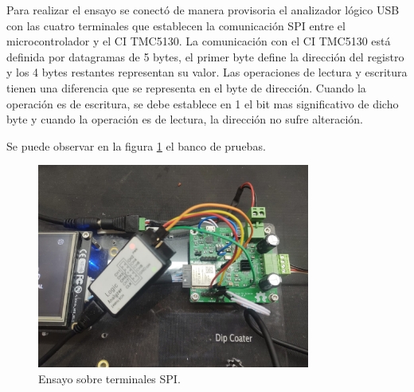  





Para realizar el ensayo se conectó de manera provisoria el analizador lógico USB con las cuatro terminales que establecen la comunicación SPI entre el microcontrolador y el CI TMC5130. La comunicación con el CI TMC5130 está definida por datagramas de 5 bytes, el primer byte define la dirección del registro y los 4 bytes restantes representan su valor. Las operaciones de lectura y escritura tienen una diferencia que se representa en el byte de dirección. Cuando la operación es de escritura, se debe establece en 1 el bit mas significativo de dicho byte y cuando la operación es de lectura, la dirección no sufre alteración.

Se puede observar en la figura \ref{fig:ensayo_spi} el banco de pruebas.

\begin{figure}[h]
\centering 
\includegraphics[width=0.8\textwidth]{./Figures/ensayo_spi.jpeg}
\caption{Ensayo sobre terminales SPI.}
\label{fig:ensayo_spi}
\end{figure}

